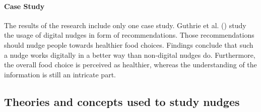 \paragraph{Case Study}
The results of the research include only one case study. Guthrie et al. (\citeyear{guthrie_nudging_2015}) study the usage of digital nudges in form of recommendations. Those recommendations should nudge people towards healthier food choices. Findings conclude that such a nudge works digitally in a better way than non-digital nudges do. Furthermore, the overall food choice is perceived as healthier, whereas the understanding of the information is still an intricate part.




\subsection{Theories and concepts used to study nudges}

